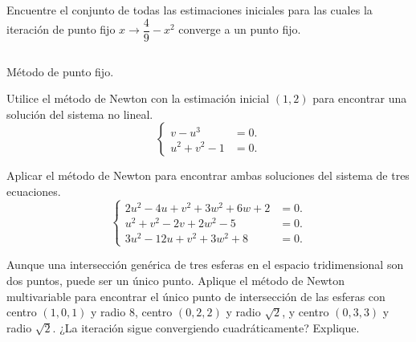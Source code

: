 \begin{questions}
    \question

    Encuentre el conjunto de todas las estimaciones iniciales para
    las cuales la iteración de punto fijo
    $x\rightarrow\dfrac{4}{9}-x^{2}$ converge a un punto fijo.

    \begin{listing}[ht!]
        \tiny
        \centering
        \inputminted[linenos,highlightlines={7-15}]{octave}{fpi.m}
        \caption{Método de punto fijo.}
    \end{listing}


    \question

    Utilice el método de Newton con la estimación inicial
    $\left(1,2\right)$ para encontrar una solución del sistema no
    lineal.
    \begin{equation*}
        \left\{
        \begin{aligned}
            v-u^{3}       & =0. \\
            u^{2}+v^{2}-1 & =0.
        \end{aligned}
        \right.
    \end{equation*}

    \question

    Aplicar el método de Newton para encontrar ambas soluciones del
    sistema de tres ecuaciones.
    \begin{equation*}
        \left\{
        \begin{aligned}
            2u^{2}-4u+v^{2}+3w^{2}+6w+2 & =0. \\
            u^{2}+v^{2}-2v+2w^{2}-5     & =0. \\
            3u^{2}-12u+v^{2}+3w^{2}+8   & =0.
        \end{aligned}
        \right.
    \end{equation*}

    \question

    Aunque una intersección genérica de tres esferas en el espacio
    tridimensional son dos puntos, puede ser un único punto.
    Aplique el método de Newton multivariable para encontrar el único
    punto de intersección de las esferas con centro
    $\left(1,0,1\right)$ y radio $8$, centro $\left(0,2,2\right)$ y
    radio $\sqrt{2}$, y centro $\left(0,3,3\right)$ y radio
    $\sqrt{2}$.
    ¿La iteración sigue convergiendo cuadráticamente?
    Explique.
\end{questions}

